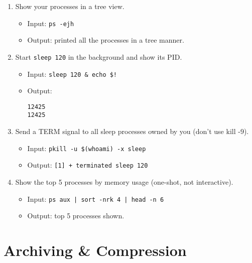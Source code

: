 \begin{enumerate}
\item Show your processes in a tree view.
\begin{itemize}
\item Input: \texttt{ps -ejh}
\item Output: printed all the processes in a tree manner.
\end{itemize}

\item Start \texttt{sleep 120} in the background and show its PID.
\begin{itemize}
\item Input: \texttt{sleep 120 \& echo \$!}
\item Output:
\begin{verbatim}
12425
12425
\end{verbatim}
\end{itemize}

\item Send a TERM signal to all sleep processes owned by you (don't use kill -9).
\begin{itemize}
\item Input: \texttt{pkill -u \$(whoami) -x sleep}
\item Output: \texttt{[1] + terminated sleep 120}
\end{itemize}

\item Show the top 5 processes by memory usage (one-shot, not interactive).
\begin{itemize}
\item Input: \texttt{ps aux | sort -nrk 4 | head -n 6}
\item Output: top 5 processes shown.
\end{itemize}
\end{enumerate}

\section{Archiving \& Compression}

